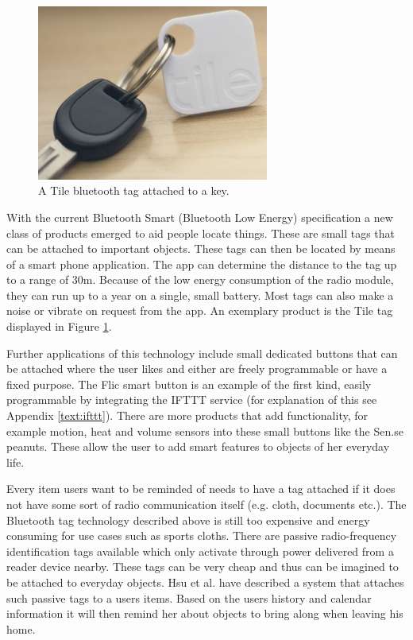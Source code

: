 \begin{figure}[ht]
\centering
	\includegraphics[keepaspectratio, width=3in]{Figures/Benchmarking/Tile_tag.jpg}
	\caption{A Tile bluetooth tag attached to a key.\protect\footnotemark}
	\label{fig:tile}
\end{figure}


With the current Bluetooth Smart (Bluetooth Low Energy) specification a new class of products emerged to aid people locate things. These are small tags that can be attached to important objects. These tags can then be located by means of a smart phone application. The app can determine the distance to the tag up to a range of 30m. Because of the low energy consumption of the radio module, they can run up to a year on a single, small battery. Most tags can also make a noise or vibrate on request from the app. An exemplary product is the Tile tag\cite{tile} displayed in Figure \ref{fig:tile}.

Further applications of this technology include small dedicated buttons that can be attached where the user likes and either are freely programmable or have a fixed purpose.
The Flic smart button\cite{flic} is an example of the first kind, easily programmable by integrating the IFTTT service (for explanation of this see Appendix \ref{text:ifttt}). 
There are more products that add functionality, for example motion, heat and volume sensors into these small buttons like the Sen.se peanuts\cite{peanuts}. These allow the user to add smart features to objects of her everyday life.

Every item users want to be reminded of needs to have a tag attached if it does not have some sort of radio communication itself (e.g. cloth, documents etc.). The Bluetooth tag technology described above is still too expensive and energy consuming for use cases such as sports cloths. There are passive radio-frequency identification tags available which only activate through power delivered from a reader device nearby. These tags can be very cheap and thus can be imagined to be attached to everyday objects\cite{weis2007rfid}. Hsu et al. have described a system that attaches such passive tags to a users items. Based on the users history and calendar information it will then remind her about objects to bring along when leaving his home\cite{hsu2011rfid}.


